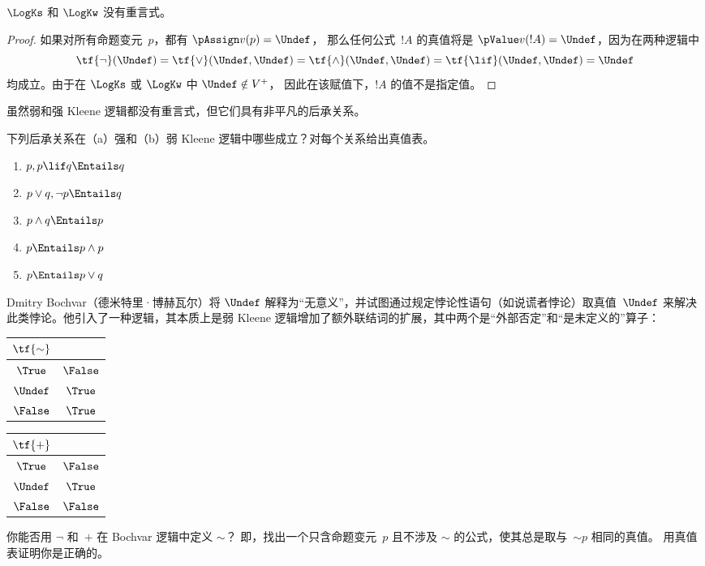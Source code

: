 \documentclass[../../../include/open-logic-section]{subfiles}
\begin{document}
\begin{prop}
  $\LogKs$ 和 $\LogKw$ 没有重言式。
\end{prop}

\begin{proof}
  如果对所有命题变元~$p$，都有 $\pAssign v(p) = \Undef$，
  那么任何公式~$!A$ 的真值将是 $\pValue v(!A) =
  \Undef$，因为在两种逻辑中 \[
    \tf{\lnot}(\Undef) = \tf{\lor}(\Undef, \Undef) = \tf{\land}(\Undef,
  \Undef) = \tf{\lif}(\Undef, \Undef) = \Undef
  \] 均成立。由于在 $\LogKs$ 或
  $\LogKw$ 中 $\Undef \notin V^+$，
  因此在该赋值下，$!A$ 的值不是指定值。
\end{proof}

虽然弱和强 Kleene 逻辑都没有重言式，但它们具有非平凡的后承关系。

\begin{prob}
  下列后承关系在（a）强和（b）弱 Kleene 逻辑中哪些成立？对每个关系给出真值表。
  \begin{enumerate}
    \item $p, p \lif q \Entails q$
    \item $p \lor q, \lnot p \Entails q$
    \item $p \land q \Entails p$
    \item $p \Entails p \land p$
    \item $p \Entails p \lor q$
  \end{enumerate}
\end{prob}

Dmitry Bochvar（德米特里·博赫瓦尔）将 $\Undef$ 解释为“无意义”，并试图通过规定悖论性语句（如说谎者悖论）取真值~$\Undef$ 来解决此类悖论。他引入了一种逻辑，其本质上是弱 Kleene 逻辑增加了额外联结词的扩展，其中两个是“外部否定”和“是未定义的”算子：
\begin{center}
  \begin{tabular}{c|c}
    $\tf{\sim}$ & \\
    \hline
    $\True$ & $\False$ \\
    $\Undef$ & $\True$ \\
    $\False$ & $\True$
  \end{tabular}
\quad
  \begin{tabular}{c|c}
    $\tf{+}$ & \\
    \hline
    $\True$ & $\False$ \\
    $\Undef$ & $\True$ \\
    $\False$ & $\False$
  \end{tabular}
\end{center}

\begin{prob}
  你能否用 $\lnot$ 和~$+$ 在 Bochvar 逻辑中定义 $\sim$？
  即，找出一个只含命题变元~$p$ 且不涉及 $\sim$ 的公式，使其总是取与~$\mathord{\sim}p$ 相同的真值。
  用真值表证明你是正确的。
\end{prob}
\end{document}
